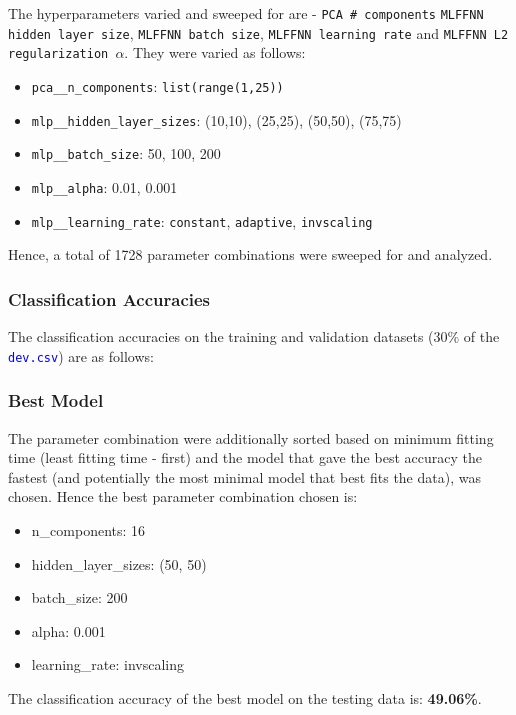 \documentclass[11pt,a4paper]{article}
\newcommand{\noi}{\noindent}
\def\tt#1{\texttt{#1}}
\def\colortt#1{\textcolor{blue}{\texttt{#1}}}
\begin{document}
\noi
The hyperparameters varied and sweeped for are - \tt{PCA \# components} \tt{MLFFNN hidden layer size}, \tt{MLFFNN batch size}, \tt{MLFFNN learning rate} and \tt{MLFFNN L2 regularization $\alpha$}. They were varied as follows:
\begin{itemize}
    \itemsep0em
    \item \tt{pca\_\_n\_components}: \tt{list(range(1,25))}
    \item \tt{mlp\_\_hidden\_layer\_sizes}: (10,10), (25,25), (50,50), (75,75)
    \item \tt{mlp\_\_batch\_size}: 50, 100, 200
    \item \tt{mlp\_\_alpha}: 0.01, 0.001
    \item \tt{mlp\_\_learning\_rate}: \tt{constant}, \tt{adaptive}, \tt{invscaling}
\end{itemize}

\noi
Hence, a total of 1728 parameter combinations were sweeped for and analyzed.


\subsubsection{Classification Accuracies}
The classification accuracies on the training and validation datasets (30\% of the \colortt{dev.csv}) are as follows:


\subsubsection{Best Model}
The parameter combination were additionally sorted based on minimum fitting time (least fitting time - first) and the model that gave the best accuracy the fastest (and potentially the most minimal model that best fits the data), was chosen. Hence the best parameter combination chosen is:
\begin{itemize}
    \itemsep0em
    \item n\_components: 16
    \item hidden\_layer\_sizes: (50, 50)
    \item batch\_size: 200
    \item alpha: 0.001
    \item learning\_rate: invscaling
\end{itemize}

\noi
The classification accuracy of the best model on the testing data is: \textbf{49.06\%}. \\
\end{document}
